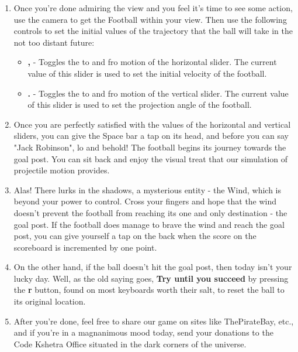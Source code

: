 \documentclass[12pt]{article} %
\begin{document}
\begin{enumerate}
\item{Once you're done admiring the view and you feel it's time to see some action, use the camera to get the Football within your view. Then use the following controls to set the initial values of the trajectory that the ball will take in the not too distant future:}
\begin{itemize}
\item{\textbf{,} - Toggles the to and fro motion of the  horizontal slider. The current value of this slider is used to set the initial velocity of the football.}
\item{\textbf{.} - Toggles the to and fro motion of the  vertical slider. The current value of this slider is used to set the projection angle of the football.}
\end{itemize}

\item{Once you are perfectly satisfied with the values of the horizontal and vertical sliders, you can give the Space bar a tap on its head, and before you can say "Jack Robinson", lo and behold! The football begins its journey towards the goal post. You can sit back and enjoy the visual treat that our simulation of projectile motion provides.}

\item{Alas! There lurks in the shadows, a mysterious entity - the Wind, which is beyond your power to control. Cross your fingers and hope that the wind doesn't prevent the football from reaching its one and only destination - the goal post. If the football does manage to brave the wind and reach the goal post, you can give yourself a tap on the back when the score on the scoreboard is incremented by one point.}

\item{On the other hand, if the ball doesn't hit the goal post, then today isn't your lucky day. Well, as the old saying goes, \textbf{Try until you succeed} by pressing the \textbf{r} button, found on most keyboards worth their salt, to reset the ball to its original location.}

\item{After you're done, feel free to share our game on sites like ThePirateBay, etc., and if you're in a magnanimous mood today, send your donations to the Code Kshetra Office situated in the dark corners of the universe.}

\end{enumerate}
\newpage
\end{document}
